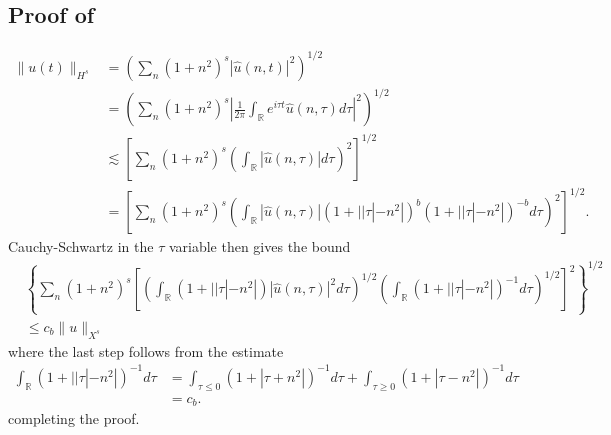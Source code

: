 \documentclass[12pt,reqno]{amsart}
\numberwithin{equation}{section}  %
\renewcommand{\cref}{\Cref}
\newcommand{\rr}{\mathbb{R}}
\newcommand{\wh}{\widehat}
\begin{document}
\begin{appendices}
\subsection{Proof of \cref{lem:embedding}} 
\label{ssec:embedding-pf}
%
%
\begin{equation*}
\begin{split}
  \| u(t) \|_{H^{s}}
  & = \left( \sum_{n} (1 + n^{2})^{s} |
  \wh{u}(n, t) |^{2} \right)^{1/2}
  \\
  & = \left( \sum_{n} (1 + n^{2})^{s} | \frac{1}{2\pi}
  \int_{\rr}e^{i \tau t} \wh{u}(n, \tau) d \tau |^{2} \right)^{1/2}
  \\
  & \lesssim \left[ \sum_{n} (1 + n^{2})^{s} \left( \int_{\rr} |
  \wh{u}(n, \tau)
  | d \tau \right)^{2} \right]^{1/2}
  \\
  & = \left[ \sum_{n} (1 + n^{2})^{s} \left( \int_{\rr} |
  \wh{u}(n, \tau)
  | (1 + | | \tau | - n^{2} |)^{b} (1 + | | \tau | - n^{2} |)^{-b} d \tau
  \right)^{2} \right]^{1/2}.
\end{split}
\end{equation*}
%
%
Cauchy-Schwartz in the $\tau$ variable then gives the bound
%
%
\begin{equation*}
\begin{split}
  & \left \{\sum_{n} (1 + n^{2})^{s} \left[ \left( \int_{\rr} (1 + | |
  \tau | - n^{2}
  |) | \wh{u}(n, \tau) |^{2} d \tau  \right)^{1/2} 
 \left( \int_{\rr} (1 + | |
  \tau | - n^{2}
  |)^{-1}  d \tau  \right)^{1/2}
  \right]^{2}\right \}^{1/2}
  \\
  & \le c_{b} \| u \|_{X^{s}}
\end{split}
\end{equation*}
%
where the last step follows from the estimate
%
%
%
%
\begin{equation*}
\begin{split}
\int_{\rr} (1 + | |
  \tau | - n^{2}
  |)^{-1}  d \tau 
  & = \int_{\tau \le 0} (1 + 
  |\tau  + n^{2}
  |)^{-1}  d \tau  + \int_{\tau \ge 0} (1 + | 
  \tau - n^{2}
  |)^{-1}  d \tau
  \\
  & = c_{b}.
\end{split}
\end{equation*}
%
%
completing the proof. \qquad \qedsymbol
%

\end{appendices}
\end{document}
